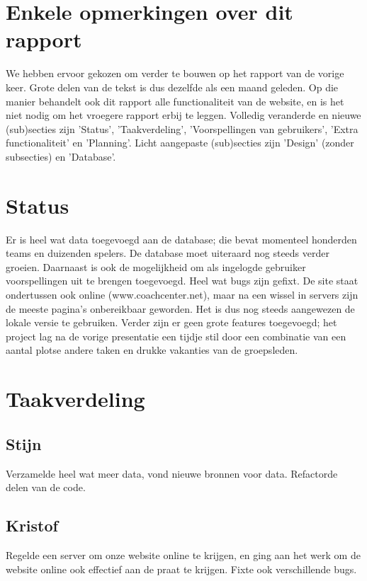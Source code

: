 \documentclass[11pt, a4paper]{article}
\begin{document}
\title{}
\author{Groep A\\ Rapport 1}
\date{19 maart 2014}
\maketitle


\section{Enkele opmerkingen over dit rapport}
We hebben ervoor gekozen om verder te bouwen op het rapport van de vorige keer. Grote delen van de tekst is dus dezelfde als een maand geleden. Op die manier behandelt ook dit rapport alle functionaliteit van de website, en is het niet nodig om het vroegere rapport erbij te leggen. Volledig veranderde en nieuwe (sub)secties zijn 'Status', 'Taakverdeling', 'Voorspellingen van gebruikers',  'Extra functionaliteit' en 'Planning'. Licht aangepaste (sub)secties zijn 'Design' (zonder subsecties) en 'Database'.
\section{Status}
Er is heel wat data toegevoegd aan de database; die bevat momenteel honderden teams en duizenden spelers. De database moet uiteraard nog steeds verder groeien. Daarnaast is ook de mogelijkheid om als ingelogde gebruiker voorspellingen uit te brengen toegevoegd. Heel wat bugs zijn gefixt. De site staat ondertussen ook online (www.coachcenter.net), maar na een wissel in servers zijn de meeste pagina's onbereikbaar geworden. Het is dus nog steeds aangewezen de lokale versie te gebruiken. Verder zijn er geen grote features toegevoegd; het project lag na de vorige presentatie een tijdje stil door een combinatie van een aantal plotse andere taken en drukke vakanties van de groepsleden.

\section{Taakverdeling}
\subsection{Stijn}
Verzamelde heel wat meer data, vond nieuwe bronnen voor data. Refactorde delen van de code.
\subsection{Kristof}
Regelde een server om onze website online te krijgen, en ging aan het werk om de website online ook effectief aan de praat te krijgen. Fixte ook verschillende bugs.
\end{document}
